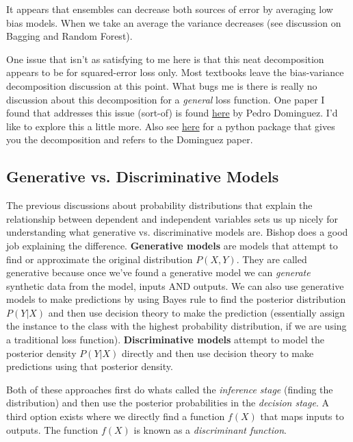It appears that ensembles can decrease both sources of error by averaging low bias models. When we take an average the variance decreases (see discussion on Bagging and Random Forest).

One issue that isn't as satisfying to me here is that this neat decomposition appears to be for squared-error loss only. Most textbooks leave the bias-variance decomposition discussion at this point. What bugs me is there is really no discussion about this decomposition for a \emph{general} loss function. One paper I found that addresses this issue (sort-of) is found \href{https://homes.cs.washington.edu/~pedrod/bvd.pdf}{here} by Pedro Dominguez. I'd like to explore this a little more. Also see \href{https://github.com/rasbt/mlxtend/blob/master/docs/sources/user_guide/evaluate/bias_variance_decomp.ipynb?utm_campaign=Data_Elixir&utm_source=Data_Elixir_210}{here} for a python package that gives you the decomposition and refers to the Dominguez paper.




\subsection{Generative vs. Discriminative Models}

The previous discussions about probability distributions that explain the relationship between dependent and independent variables sets us up nicely for understanding what generative vs. discriminative models are. Bishop does a good job explaining the difference. \textbf{Generative models} are models that attempt to find or approximate the original distribution $P(X,Y)$. They are called generative because once we've found a generative model we can \emph{generate} synthetic data from the model, inputs AND outputs. We can also use generative models to make predictions by using Bayes rule to find the posterior distribution $P(Y|X)$ and then use decision theory to make the prediction (essentially assign the instance to the class with the highest probability distribution, if we are using a traditional loss function). \textbf{Discriminative models} attempt to model the posterior density $P(Y|X)$ directly and then use decision theory to make predictions using that posterior density. 

Both of these approaches first do whats called the \emph{inference stage} (finding the distribution) and then use the posterior probabilities in the \emph{decision stage}. A third option exists where we directly find a function $f(X)$ that maps inputs to outputs. The function $f(X)$ is known as a \emph{discriminant function}.

